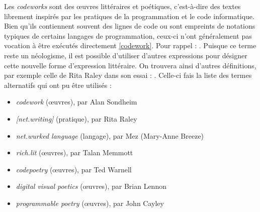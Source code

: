 \documentclass[12pt]{article} %
\begin{document}
Les \textit{codeworks} sont des œuvres littéraires et poétiques, c'est-à-dire des textes librement inspirés par les pratiques de la programmation et le code informatique. Bien qu'ils contiennent souvent des lignes de code ou sont empreints de notations typiques de certains langages de programmation, ceux-ci n'ont généralement pas vocation à être exécutés directement \ref{codework}. Pour rappel :  \cite{ELO-ContentByKeyword}. Puisque ce terme reste un néologisme, il est possible d'utiliser d'autres expressions pour désigner cette nouvelle forme d'expression littéraire. On trouvera ainsi d'autres définitions, par exemple celle de Rita Raley dans son essai  :  \cite{RRita-codework}. Celle-ci fais la liste des termes alternatifs qui ont pu être utilisés :
\begin{itemize}
    \item \textit{codework} (œuvres), par Alan Sondheim
    \item \textit{[net.writing]} (pratique), par Rita Raley
    \item \textit{net.wurked language} (langage), par Mez (Mary-Anne Breeze)
    \item \textit{rich.lit} (œuvres), par Talan Memmott
    \item \textit{codepoetry} (œuvres), par Ted Warnell
    \item \textit{digital visual poetics} (œuvres), par Brian Lennon
    \item \textit{programmable poetry} (œuvres), par John Cayley
\end{itemize}
\end{document}
